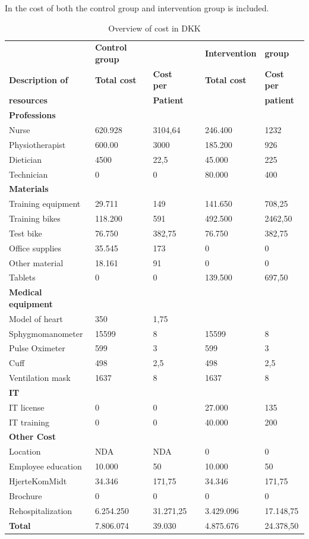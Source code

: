 In  the cost of both the control group and intervention group is included.
\begin{table} [H]
\begin{tabular}{llllll}
\hline
& \textbf{Control group} &  & & \textbf{Intervention} & \textbf{group}\\
\cline{2-3} \cline{5-6}
\textbf{Description of} \quad & \textbf{Total cost} & \textbf{Cost per}  & &\textbf{Total cost} & \textbf{Cost per} \\
\textbf{resources}&& \textbf{Patient} &&& \textbf{patient}\\
\hline
\textbf{Professions}      & & &    &      \\
Nurse      & 620.928 & 3104,64   & & 246.400        & 1232       \\
Physiotherapist  & 600.00 & 3000 &  & 185.200     & 926     \\
Dietician  & 4500   & 22,5   &  & 45.000 & 225     \\
Technician & 0      & 0  &  & 80.000 & 400  \\
\textbf{Materials} & & \\
Training equipment & 29.711 & 149 && 141.650 & 708,25\\
Training bikes & 118.200  & 591 & & 492.500 & 2462,50 \\
Test bike & 76.750 & 382,75 && 76.750 & 382,75\\
Office supplies & 35.545 & 173 && 0& 0 \\
Other material & 18.161 & 91 && 0 & 0\\
Tablets & 0 & 0 && 139.500 & 697,50\\
\textbf{Medical equipment} & & & &\\
Model of heart & 350 & 1,75 & &&\\
Sphygmomanometer & 15599 & 8& & 15599 & 8\\
Pulse Oximeter & 599 & 3 && 599 & 3\\
Cuff & 498 & 2,5 && 498 & 2,5\\
Ventilation mask & 1637 & 8 && 1637 & 8\\
\textbf{IT} & & & &\\
IT license & 0 & 0 & &27.000 & 135\\
IT training & 0 & 0 & &40.000 & 200\\
\textbf{Other Cost} & & & &\\
Location & NDA & NDA & &0 & 0 \\
Employee education & 10.000 & 50 & &10.000 & 50\\
HjerteKomMidt & 34.346 & 171,75 && 34.346 & 171,75\\
Brochure & 0&0 &&0 &0\\
Rehospitalization & 6.254.250 & 31.271,25 & &3.429.096 & 17.148,75\\ \hline\hline
\textbf{Total} & 7.806.074 & 39.030 && 4.875.676 & 24.378,50 \\
\hline
\end{tabular}
\caption{Overview of cost in DKK}
\label{tab: allinone}
\end{table}


